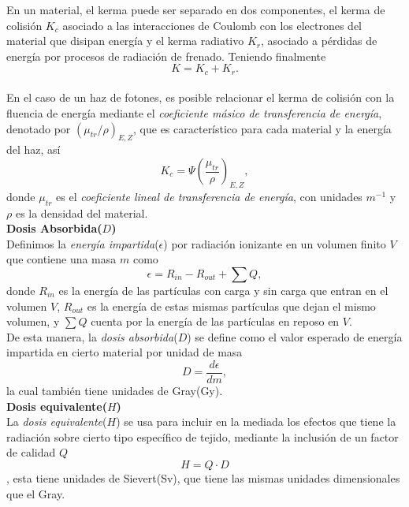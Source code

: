 En un material, el kerma puede ser separado en dos componentes, el kerma de colisión $K_c$  asociado a las interacciones de Coulomb con los electrones del material que disipan energía y el kerma radiativo $K_r$, asociado a pérdidas de energía por procesos de radiación de frenado. Teniendo finalmente 
\begin{equation}
	K=K_c+K_r.
\end{equation}\\

En el caso de un haz de fotones, es posible relacionar el kerma de colisión con la fluencia de energía mediante el \textit{coeficiente másico de transferencia de energía}, denotado por $(\mu_{tr}/\rho)_{E,Z}$, que es característico para cada material y la energía del haz, así
\begin{equation}
K_c=\Psi \left(\frac{\mu_{tr}}{\rho}\right)_{E,Z},
\end{equation} 
donde $\mu_{tr}$ es el \textit{coeficiente lineal de transferencia de energía}, con unidades $m^{-1}$ y $\rho$ es la densidad del material.\\

\noindent
\textbf{Dosis Absorbida($D$)}\\

Definimos la \textit{energía impartida}($\epsilon$) por radiación ionizante en un volumen finito $V$ que contiene una masa $m$ como
\begin{equation}
	\epsilon =R_{in}-R_{out}+\sum Q,
\end{equation}
donde $R_{in}$ es la energía de las partículas con carga y sin carga que entran en el volumen $V$, $R_{out}$ es la energía de estas mismas partículas que dejan el mismo volumen, y $\sum Q$ cuenta por la energía de las partículas en reposo en $V$.\\

De esta manera, la \textit{dosis absorbida}($D$) se define como el valor esperado de energía impartida en cierto material por unidad de masa
\begin{equation}
D=\frac{d\epsilon}{dm},
\end{equation}
la cual también tiene unidades de Gray(Gy).\\

\noindent
\textbf{Dosis equivalente($H$)}\\

La \textit{dosis equivalente}($H$) se usa para incluir en la mediada los efectos que tiene la radiación sobre cierto tipo específico de tejido, mediante la inclusión de un factor de calidad $Q$
\begin{equation}
H=Q\cdot D
\end{equation},
esta tiene unidades de Sievert(Sv), que tiene las mismas unidades dimensionales que el Gray.\\

